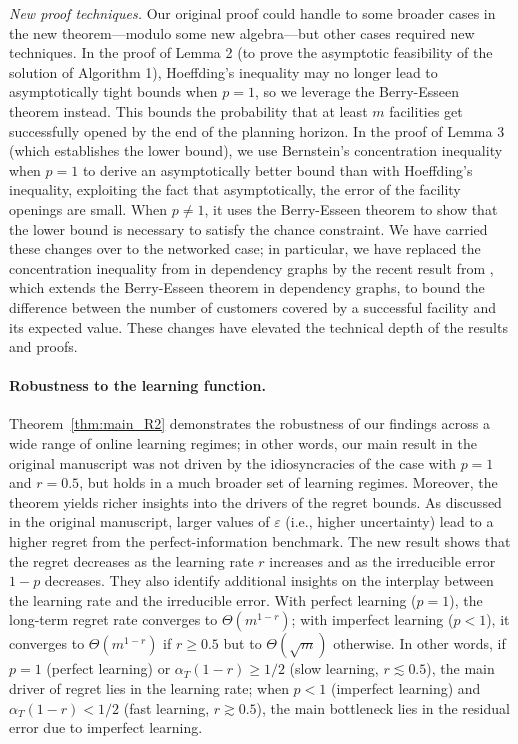 \documentclass[11pt]{article}
\begin{document}
\textit{New proof techniques.}
Our original proof could handle to some broader cases in the new theorem---modulo some new algebra---but other cases required new techniques. In the proof of Lemma 2 (to prove the asymptotic feasibility of the solution of Algorithm 1), Hoeffding's inequality may no longer lead to asymptotically tight bounds when $p=1$, so we leverage the Berry-Esseen theorem instead. This bounds the probability that at least $m$ facilities get successfully opened by the end of the planning horizon. In the proof of Lemma 3 (which establishes the lower bound), we use Bernstein's concentration inequality when $p=1$ to derive an asymptotically better bound than with Hoeffding's inequality, exploiting the fact that asymptotically, the error of the facility openings are small. When $p\neq1$, it uses the Berry-Esseen theorem to show that the lower bound is necessary to satisfy the chance constraint. We have carried these changes over to the networked case; in particular, we have replaced the concentration inequality from \cite{janson2004large} in dependency graphs by the recent result from \cite{janisch2024berry}, which extends the Berry-Esseen theorem in dependency graphs, to bound the difference between the number of customers covered by a successful facility and its expected value. These changes have elevated the technical depth of the results and proofs.

\paragraph{Robustness to the learning function.}

Theorem~\ref{thm:main_R2} demonstrates the robustness of our findings across a wide range of online learning regimes; in other words, our main result in the original manuscript was not driven by the idiosyncracies of the case with $p=1$ and $r=0.5$, but holds in a much broader set of learning regimes. Moreover, the theorem yields richer insights into the drivers of the regret bounds. As discussed in the original manuscript, larger values of $\varepsilon$ (i.e., higher uncertainty) lead to a higher regret from the perfect-information benchmark. The new result shows that the regret decreases as the learning rate $r$ increases and as the irreducible error $1-p$ decreases. They also identify additional insights on the interplay between the learning rate and the irreducible error. With perfect learning ($p=1$), the long-term regret rate converges to $\Theta\left(m^{1-r}\right)$; with imperfect learning ($p<1$), it converges to $\Theta\left(m^{1-r}\right)$ if $r\geq0.5$ but to $\Theta(\sqrt m)$ otherwise. In other words, if $p=1$ (perfect learning) or $\alpha_T(1-r)\geq1/2$ (slow learning, $r\lesssim0.5$), the main driver of regret lies in the learning rate; when $p<1$ (imperfect learning) and $\alpha_T(1-r)<1/2$ (fast learning, $r\gtrsim0.5$), the main bottleneck lies in the residual error due to imperfect learning.
\end{document}
